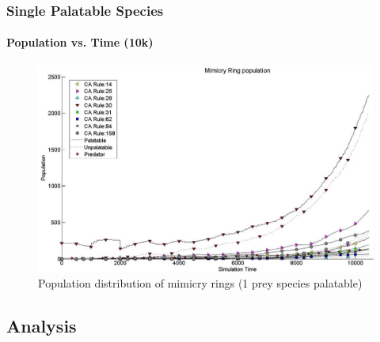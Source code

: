 \frame
{
	\frametitle{Single Palatable Species}
	\framesubtitle{Population vs. Time (10k)}

	\begin{figure}[H]
		\centering
		\includegraphics[scale=0.25]{../tex/images/simTime10k-1Prey-p}
		\caption{Population distribution of mimicry rings (1 prey species palatable)}
		\label{fig:plot-1-prey-p}
	\end{figure}
}

\subsection{Analysis}